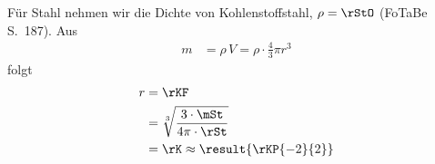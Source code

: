 Für Stahl nehmen wir die Dichte von Kohlenstoffstahl, $\rho = \rStO$ (FoTaBe S.~187). Aus
\begin{align}
 m &= \rho\,V = \rho\cdot\frac{4}{3}\pi r^3
\end{align}
folgt
\begin{align}
 r &= \rKF \\
   &= \sqrt[3]{\frac{3\cdot\mSt}{4\pi\cdot\rSt}} \\
   &= \rK \approx \result{\rKP{-2}{2}}
\end{align}
